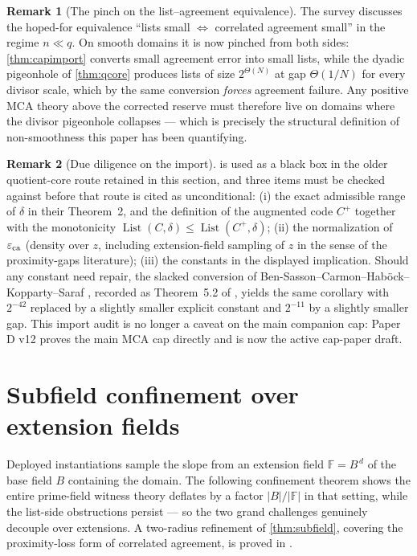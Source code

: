 \documentclass[11pt]{article}
\theoremstyle{definition}
\newtheorem{remark}[remark]{Remark}
\newcommand{\F}{\mathbb F}
\newcommand{\eps}{\varepsilon}
\newcommand{\eca}{\eps_{\rm ca}}
\newcommand{\Lst}{\operatorname{List}}
\begin{document}
\begin{remark}[The pinch on the list--agreement equivalence]\label{rem:pinch}
The survey \cite{ABF26} discusses the hoped-for equivalence ``lists small $\Leftrightarrow$ correlated agreement small'' in the regime $n\ll q$.  On smooth domains it is now pinched from both sides: \cref{thm:capimport} converts small agreement error into small lists, while the dyadic pigeonhole of \cref{thm:qcore} produces lists of size $2^{\Theta(N)}$ at gap $\Theta(1/N)$ for every divisor scale, which by the same conversion \emph{forces} agreement failure.  Any positive MCA theory above the corrected reserve must therefore live on domains where the divisor pigeonhole collapses --- which is precisely the structural definition of non-smoothness this paper has been quantifying.
\end{remark}

\begin{remark}[Due diligence on the import]\label{rem:diligence}
 is used as a black box in the older quotient-core route retained in this section, and three items must be checked against \cite{CS25} before that route is cited as unconditional: (i) the exact admissible range of $\delta$ in their Theorem~2, and the definition of the augmented code $C^+$ together with the monotonicity $\Lst(C,\delta)\le\Lst(C^+,\delta)$; (ii) the normalization of $\eca$ (density over $z$, including extension-field sampling of $z$ in the sense of the proximity-gaps literature); (iii) the constants in the displayed implication.  Should any constant need repair, the slacked conversion of Ben-Sasson--Carmon--Hab\"ock--Kopparty--Saraf \cite{BCHKS25}, recorded as Theorem~5.2 of \cite{ABF26}, yields the same corollary with $2^{-42}$ replaced by a slightly smaller explicit constant and $2^{-11}$ by a slightly smaller gap.  This import audit is no longer a caveat on the main companion cap: Paper D v12 proves the main MCA cap directly and is now the active cap-paper draft.
\end{remark}

\section{Subfield confinement over extension fields}\label{sec:subfield}

Deployed instantiations sample the slope from an extension field $\F=B^{\,d}$ of the base field $B$ containing the domain.  The following confinement theorem shows the entire prime-field witness theory deflates by a factor $|B|/|\F|$ in that setting, while the list-side obstructions persist --- so the two grand challenges genuinely decouple over extensions.  A two-radius refinement of \cref{thm:subfield}, covering the proximity-loss form of correlated agreement, is proved in \cite[Lem.\ ``subfield confinement'']{UniversalCap}.
\end{document}
